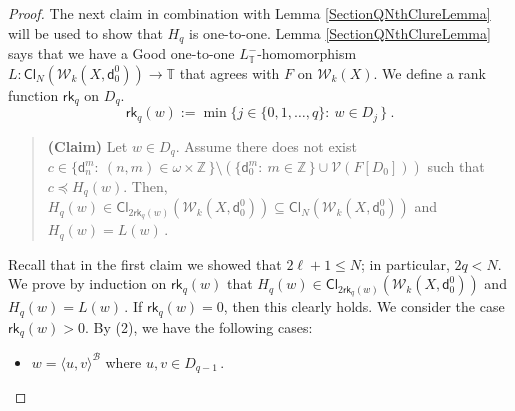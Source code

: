 \documentclass[10pt,a4paper, openany,  oldfontcommands]{memoir}
\newtheorem{open problem} [theorem] {Open Problem}
\newtheorem{open question} [theorem] {Open Question}
\begin{document}
\begin{proof}
 

 
 
 
 
 
 
 The next claim in combination with  Lemma    \ref{SectionQNthClureLemma} will be used to show that  $  H_q  $  is  one-to-one. 
 Lemma      \ref{SectionQNthClureLemma}  says that  
we have a  \textsf{Good}   one-to-one  $  L_{  \mathbb{T} }^- $-homomorphism   
 $L  :    \mathsf{Cl}_N  \left(    \mathcal{W}_k  \left( X  ,  \mathsf{d}^0_0 \right)    \right)  \to  \mathbb{T} $ 
 that agrees with $F$ on   $  \mathcal{W}_k  \left( X  \right)  $.  
 We  define a rank function  $  \mathsf{rk}_q  $  on  $  D_q $. 
 \[
\mathsf{rk}_q  \left(  w   \right) :=      \min  \lbrace   j  \in  \lbrace 0, 1,  \ldots ,  q  \rbrace :   \   w   \in  D_j  \,  \rbrace 
\       .
\]
 
 
    \begin{quote} {\bf (Claim)} \;\;\;\;\;\;    
    Let   $  w  \in  D_q  $.
Assume there does not exist    $ c  \in  \big\{  \mathsf{d}^m_n :   \  (n, m  )  \in  \omega  \times  \mathbb{Z}  \,  \rbrace 
\setminus  \left(    \big\{  \mathsf{d}^m_0 :   \   m  \in   \mathbb{Z}  \,  \rbrace   \cup  \mathcal{V} \left(  F \left[ D_0  \right]  \right)    \right)   $ 
such that  $  c  \preceq   H_q (w)   $. 
Then,   $  H_q (w)   \in      \mathsf{Cl}_{   2\mathsf{rk}_q  \left(  w   \right) }  \left(    \mathcal{W}_k  \left( X   ,  \mathsf{d}^0_0  \right)    \right)   
\subseteq    \mathsf{Cl}_{   N }  \left(    \mathcal{W}_k  \left( X    ,  \mathsf{d}^0_0  \right)    \right)       $
and  $  H_q  (w)  =  L(w)  \,  $. 
 \end{quote}  
 
 
 
 Recall that  in the first claim we showed that  $  2 \ell   +1  \leq  N   $; 
 in particular,  $  2q  <  N  $. 
 We prove by induction on   $    \mathsf{rk}_q  \left(  w   \right)    $  that  
  $  H_q (w)   \in      \mathsf{Cl}_{   2\mathsf{rk}_q  \left(  w   \right) }  \left(    \mathcal{W}_k  \left( X    ,  \mathsf{d}^0_0   \right)    \right)     $
  and  $  H_q (w)  =  L(w)  \,   $. 
  If  $  \mathsf{rk}_q  \left(   w   \right)  = 0 $,  then this clearly holds. 
We consider the case  $   \mathsf{rk}_q  \left(   w  \right)   >  0  $. 
By (2),  we   have the following cases: 
\begin{itemize}
\item[(a)]  $     w  =  \langle u,  v  \rangle^{  \mathcal{B}  }  $  where  
$  u,  v  \in  D_{q-1}     \,  $.





\end{itemize}
\end{proof}
\end{document}
